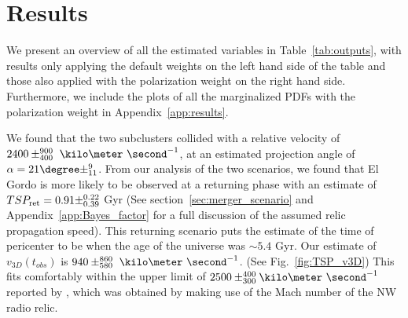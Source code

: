 \section{Results} 
We present an
overview of all the estimated variables in Table~\ref{tab:outputs}, with
results only applying the default weights on the left hand side of the table
and those also applied with the polarization weight on the right hand side.
Furthermore, we include the plots of all the marginalized PDFs with the
polarization weight in Appendix~\ref{app:results}. \par
We found that the two subclusters collided with a relative velocity of $2400\pm^{900}_{400}~\kilo\meter~\second^{-1}$, at an estimated projection
angle of $\alpha = 21\degree\pm^{9}_{11}$. From our analysis of the two
scenarios, we found that El Gordo is more likely to be observed at a returning
phase with an estimate of $TSP_{\rm ret} = 0.91\pm^{0.22}_{0.39}$ Gyr
(See section~\ref{sec:merger_scenario} and Appendix~\ref{app:Bayes_factor}
for a full discussion of the assumed relic propagation speed). This
returning scenario puts the
estimate of the time of pericenter to be when the age of the universe was
$\sim5.4$ Gyr. 
Our estimate of $v_{3D}(t_{obs})$ is
$940\pm^{860}_{580}~\kilo\meter~\second^{-1}$. (See Fig.~\ref{fig:TSP_v3D})
This fits comfortably within the upper limit of $2500
\pm^{400}_{300}\kilo\meter~\second^{-1}$ reported by \cite{L13},
which was obtained by making use of the Mach number of the NW radio relic.

